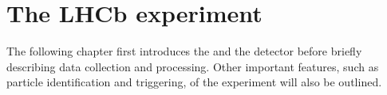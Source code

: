 \chapter{The LHCb experiment}
\label{ch:lhcb}

The following chapter first introduces the \lhc and the \lhcb detector before briefly
describing data collection and processing.
Other important features, such as particle identification and triggering, of the \lhcb experiment
will also be outlined.









\clearpage
